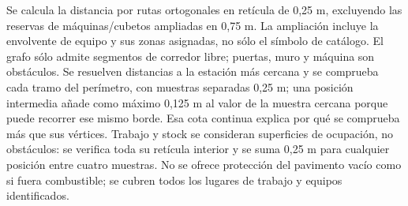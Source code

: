 Se calcula la distancia por rutas ortogonales en retícula de 0,25 m, excluyendo las reservas de máquinas/cubetos ampliadas en 0,75 m. La ampliación incluye la envolvente de equipo y sus zonas asignadas, no sólo el símbolo de catálogo. El grafo sólo admite segmentos de corredor libre; puertas, muro y máquina son obstáculos. Se resuelven distancias a la estación más cercana y se comprueba cada tramo del perímetro, con muestras separadas 0,25 m; una posición intermedia añade como máximo 0,125 m al valor de la muestra cercana porque puede recorrer ese mismo borde. Esa cota continua explica por qué se comprueba más que sus vértices. Trabajo y stock se consideran superficies de ocupación, no obstáculos: se verifica toda su retícula interior y se suma 0,25 m para cualquier posición entre cuatro muestras. No se ofrece protección del pavimento vacío como si fuera combustible; se cubren todos los lugares de trabajo y equipos identificados.

